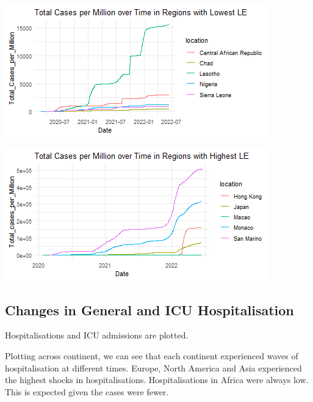 \documentclass[11pt,preprint, authoryear]{elsarticle}
\let\origfigure\figure
\let\endorigfigure\endfigure
\renewenvironment{figure}[1][2] {
    \expandafter\origfigure\expandafter[H]
} {
    \endorigfigure
}
\numberwithin{equation}{section}
\numberwithin{figure}{section}
\numberwithin{table}{section}
\begin{document}
\begin{figure}[H]

{\centering \includegraphics{Q1_files/figure-latex/Figure3-1} 

}

\caption{Caption Here \label{Figure3}}\label{fig:Figure3-1}
\end{figure}
\begin{figure}[H]

{\centering \includegraphics{Q1_files/figure-latex/Figure3-2} 

}

\caption{Caption Here \label{Figure3}}\label{fig:Figure3-2}
\end{figure}

\hypertarget{changes-in-general-and-icu-hospitalisation}{%
\subsection{Changes in General and ICU
Hospitalisation}\label{changes-in-general-and-icu-hospitalisation}}

Hospitalisations and ICU admissions are plotted.

Plotting across continent, we can see that each continent experienced
waves of hospitalisation at different times. Europe, North America and
Asia experienced the highest shocks in hospitalisations.
Hospitalisations in Africa were always low. This is expected given the
cases were fewer.
\end{document}

